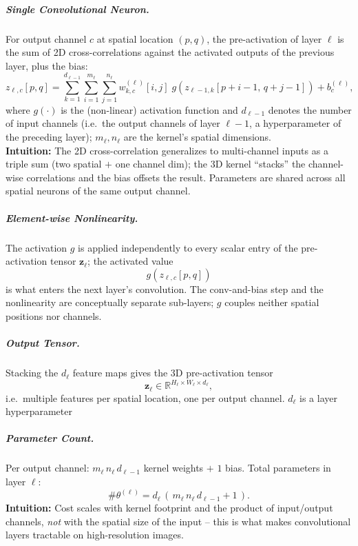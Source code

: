 \documentclass{article}
\begin{document}
\subparagraph{Single Convolutional Neuron.}
For output channel $c$ at spatial location $(p, q)$, the pre-activation of layer $\ell$ is the sum of 2D cross-correlations against the activated outputs of the previous layer, plus the bias:
\begin{equation*}
    z_{\ell, c}[p, q] = \sum_{k=1}^{d_{\ell-1}} \sum_{i=1}^{m_\ell} \sum_{j=1}^{n_\ell} w^{(\ell)}_{k, c}[i, j]\; g\!\left( z_{\ell-1, k}[p+i-1,\, q+j-1] \right) + b_c^{(\ell)},
\end{equation*}
where $g(\cdot)$ is the (non-linear) activation function and $d_{\ell-1}$ denotes the number of input channels (i.e.\ the output channels of layer $\ell-1$, a hyperparameter of the preceding layer); $m_\ell, n_\ell$ are the kernel's spatial dimensions.\\
\textbf{Intuition:} The 2D cross-correlation generalizes to multi-channel inputs as a triple sum (two spatial $+$ one channel dim); the 3D kernel ``stacks'' the channel-wise correlations and the bias offsets the result. Parameters are shared across all spatial neurons of the same output channel.

\subparagraph{Element-wise Nonlinearity.}
The activation $g$ is applied independently to every scalar entry of the pre-activation tensor $\mathbf{z}_\ell$; the activated value
\begin{equation*}
    g\!\left( z_{\ell, c}[p, q] \right)
\end{equation*}
is what enters the next layer's convolution. The conv-and-bias step and the nonlinearity are conceptually separate sub-layers; $g$ couples neither spatial positions nor channels.

\subparagraph{Output Tensor.}
Stacking the $d_\ell$ feature maps gives the 3D pre-activation tensor
\begin{equation*}
    \mathbf{z}_\ell \in \mathbb{R}^{H_\ell \times W_\ell \times d_\ell},
\end{equation*}
i.e.\ multiple features per spatial location, one per output channel. $d_\ell$ is a layer hyperparameter

\subparagraph{Parameter Count.}
Per output channel: $m_\ell\, n_\ell\, d_{\ell-1}$ kernel weights $+$ $1$ bias. Total parameters in layer $\ell$:
\begin{equation*}
    \#\theta^{(\ell)} = d_\ell \,(\, m_\ell\, n_\ell\, d_{\ell-1} + 1\,).
\end{equation*}
\textbf{Intuition:} Cost scales with kernel footprint and the product of input/output channels, \textit{not} with the spatial size of the input -- this is what makes convolutional layers tractable on high-resolution images.
\end{document}
